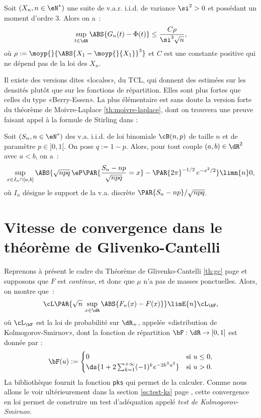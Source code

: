 \begin{theorem}
  Soit $(X_n,n\in\eN^*)$ une suite de v.a.r. i.i.d. de variance $\si^2>0$ et
  possédant un moment d'ordre $3$. Alors on a~:
  $$
  \sup_{t\in\dR}\ABS{G_n(t)-\Phi(t)} \leq \frac{C\rho}{\si^3\sqrt{n}},
  $$
  où $\rho:=\moyp{}{\ABS{X_1-\moyp{}{X_1}}^3}$ et $C$ est une constante positive qui ne
  dépend pas de la loi des $X_n$.
\end{theorem}

Il existe des versions dites «locales», du TCL, qui donnent des estimées sur
les densités plutôt que sur les fonctions de répartition. Elles sont plus
fortes que celles du type «Berry-Essen».  La plus élémentaire est sans doute
la version forte du théorème de Moivre-Laplace \ref{th:moivre-laplace}, dont
on trouvera une preuve faisant appel à la formule de Stirling dans \cite[thm
2.2.4 page 35]{dacunha-castelle-duflo} :

\begin{theorem}\label{th:moivre-laplace-fort}
  Soit $(S_n,n\in\eN^*)$ des v.a. i.i.d. de loi binomiale $\cB(n,p)$ de taille
  $n$ et de paramètre $p\in]0,1[$. On pose $q:=1-p$. Alors, pour tout couple
  $(a,b)\in\dR^2$ avec $a<b$, on a~:
  $$
  \sup_{x\in I_n\cap[a,b]}
  \ABS{\sqrt{npq}\,\eP\PAR{\frac{S_n-np}{\sqrt{npq}}=x}-\PAR{2\pi}^{-1/2}\,e^{-x^2/2}}
  \limn{n} 0,
  $$
  où $I_n$ désigne le support de la v.a. discrète $\PAR{S_n-np}/\sqrt{npq}$.
\end{theorem}

%
\section{Vitesse de convergence dans le théorème de Glivenko-Cantelli}
\label{se:vitesse-tgc}
%

Reprenons à présent le cadre du Théorème de Glivenko-Cantelli \ref{th:gc} page
\pageref{th:gc} et supposons que $F$ est \emph{continue}, et donc que $\mu$
n'a pas de masses ponctuelles. Alors, on montre que~:
\begin{equation}\label{eq:ks-gc-0}
\cL\PAR{\sqrt{n}\,\sup_{x \in \dR}\ABS{F_n(x)-F(x)}} \limE{n} \cL_{\bF},
\end{equation}
où $\cL_{\bF}$ est la loi de probabilité sur $\dR_+$, appelée «distribution de
Kolmogorov-Smirnov», dont la fonction de répartition $\bF:\dR\to[0,1]$ est
donnée par :
\begin{equation}\label{eq:def-ks-distrib}
\bF(u):=
\begin{cases}
  0 & \text{si } u\leq0,\\
  \ds{1+2 \sum_{k=1}^{+\infty} (-1)^k e^{-2k^2u^2}} & \text{si } u>0.
\end{cases}
\end{equation}
La bibliothèque \SB{} fournit la fonction \ML{} \texttt{pks} qui permet de
la calculer. Comme nous allons le voir ultérieurement dans la section
\ref{ss:test-ks} page \pageref{ss:test-ks}, cette convergence en loi permet de
construire un test d'adéquation appelé \emph{test de Kolmogorov-Smirnov}.

